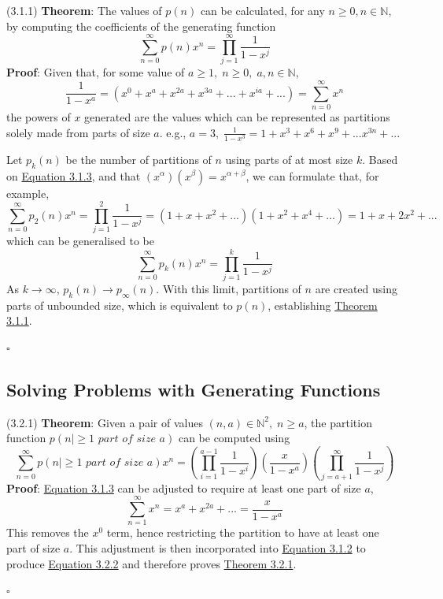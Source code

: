\documentclass{article}
\newcommand{\separate}[1] {\vspace{#1 pt}\noindent}
\newcommand{\N}{\mathbb{N}}
\newcommand{\theorem}[2]{(#1) \textbf{Theorem}: #2}
\newcommand{\proof}[1]{\textbf{Proof}: #1 \begin{flushright}\(\square\)\end{flushright}}
\begin{document}
\theorem{3.1.1}{The values of \(p(n)\) can be calculated, for any \(n \geq 0, n \in \N\), by computing the coefficients of the generating function}\label{thm:3.1.1}
\begin{equation}\tag{3.1.2}\label{eq:3.1.2}
    \sum^\infty_{n=0}p(n)x^n = \prod^\infty_{j=1}\frac{1}{1-x^j}
\end{equation}
\proof{Given that, for some value of \(a \geq 1, \; n \geq 0, \;a,n \in \N\),
\begin{equation}\tag{3.1.3}\label{eq:3.1.3}
    \frac{1}{1-x^a} = \left(x^0+x^{a} + x^{2a} + x^{3a} + ... + x^{ia} + ...\right) = \sum^\infty_{n=0} x^n
\end{equation}
the powers of \(x\) generated are the values which can be represented as partitions solely made from parts of size \(a\). e.g., \(a = 3, \; \frac{1}{1-x^3} = 1 + x^3 + x^6 + x^9 + ... x^{3n} + ...\)

\separate{2}Let \(p_k(n)\) be the number of partitions of \(n\) using parts of at most size \(k\). Based on \hyperref[eq:3.1.3]{Equation 3.1.3}, and that \((x^\alpha)(x^\beta) = x^{\alpha+\beta}\), we can formulate that, for example, 
\begin{equation}\tag{3.1.4}\label{eq:3.1.4}
    \sum^\infty_{n=0}p_2(n)x^n = \prod^2_{j=1} \frac{1}{1-x^j} = \left(1+x+x^2+...\right)\left(1+x^2 + x^4+...\right) = 1 + x + 2x^2 + ...
\end{equation}
which can be generalised to be
\begin{equation}\tag{3.1.5}\label{eq:3.1.5}
    \sum^\infty_{n=0}p_k(n)x^n = \prod^k_{j=1} \frac{1}{1-x^j}
\end{equation}
As \(k \rightarrow \infty\), \(p_k(n) \rightarrow p_\infty(n)\). With this limit, partitions of \(n\) are created using parts of unbounded size, which is equivalent to \(p(n)\), establishing \hyperref[thm:3.1.1]{Theorem 3.1.1}.}

\subsection{Solving Problems with Generating Functions}

\separate{5}\theorem{3.2.1}{Given a pair of values \((n, a) \in \N^2, \;n \geq a\), the partition function \(p(n | \geq 1\textit{ part of size a})\) can be computed using}\label{thm:3.2.1}
\begin{equation}\tag{3.2.2}\label{eq:3.2.2}
    \sum^\infty_{n=0}p(n |  \geq 1 \textit{ part of size a})x^n = \left(\prod^{a-1}_{i=1}\frac{1}{1-x^i}\right)\left(\frac{x}{1-x^a}\right)\left(\prod^\infty_{j=a+1}\frac{1}{1-x^j}\right)
\end{equation}
\newpage\noindent\proof{\hyperref[eq:3.1.3]{Equation 3.1.3} can be adjusted to require at least one part of size \(a\),
\begin{equation}\tag{3.2.3}\label{eq:3.2.3}
    \sum^\infty_{n=1}x^n = x^a + x^{2a} + ... = \frac{x}{1-x^a}
\end{equation}
\noindent This removes the \(x^0\) term, hence restricting the partition to have at least one part of size \(a\). This adjustment is then incorporated into \hyperref[eq:3.1.2]{Equation 3.1.2} to produce \hyperref[eq:3.2.2]{Equation 3.2.2} and therefore proves \hyperref[thm:3.2.1]{Theorem 3.2.1}.}
\end{document}
